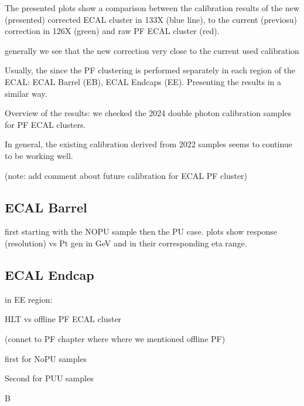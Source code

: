 The presented plots show a comparison between the calibration results of the new (presented) corrected ECAL cluster in 133X (blue line), to the current (previosu)  correction in 126X (green) and  raw PF ECAL cluster (red).

generally we see that the new correction very close to the current used calibration

Usually, the since the PF clustering is performed separately in each region of the ECAL: ECAL Barrel (EB), ECAL Endcaps (EE).
Presenting the results in a similar way.

Overview of the results: we checked the 2024 double photon calibration samples for PF ECAL clusters.

In general, the existing calibration derived from 2022 samples seems to continue to be working well.


(note: add comment about future calibration for ECAL PF cluster)

\subsection{ECAL Barrel}
first starting with the NOPU sample then the PU case.
plots show response (resolution) vs Pt gen in GeV and in their corresponding eta range.





\subsection{ECAL Endcap}
in EE region:





HLT vs offline PF ECAL cluster

(connet to PF chapter where where we mentioned offline PF)

first for NoPU samples

Second for PUU samples

B
